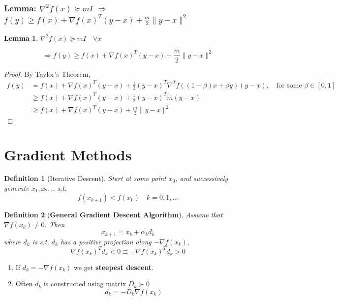 \documentclass[11pt,a4paper]{article}
\newtheorem{lemma}{Lemma}
\newtheorem{definition}{Definition}
\begin{document}
\subsubsection{Lemma: $\nabla^2 f(x)\succeq mI$ $\Rightarrow$ $f(y)\geq f(x)+\nabla f(x)^T(y-x)+\frac{m}{2}\|y-x\|^2$}
\begin{lemma}
$\nabla^2 f(x)\succeq mI\quad \forall x$

$$\Rightarrow f(y)\geq f(x)+\nabla f(x)^T(y-x)+\frac{m}{2}\|y-x\|^2$$
\end{lemma}
\begin{proof}
    By Taylor's Theorem,
    \begin{equation}
        \begin{aligned}
            f(y)&=f(x)+\nabla f(x)^T(y-x)+\frac{1}{2}(y-x)^T \nabla^T f((1-\beta)x+\beta y)(y-x),\quad \text{for some }\beta\in[0,1]\\
            &\geq f(x)+\nabla f(x)^T(y-x)+\frac{1}{2}(y-x)^Tm(y-x)\\
            &\geq f(x)+\nabla f(x)^T(y-x)+\frac{m}{2}\|y-x\|^2
        \end{aligned}
        \nonumber
    \end{equation}
\end{proof}

















\section{Gradient Methods}
\begin{definition}[Iterative Descent]
Start at some point $x_0$, and successively generate $x_1,x_2,..$ s.t. $$f(x_{k+1})<f(x_k)\quad k=0,1,...$$
\end{definition}

\begin{definition}[\textbf{General Gradient Descent Algorithm}]
    Assume that $\nabla f(x_k)\neq 0$. Then
    $$x_{k+1}=x_k+\alpha_k d_k$$
    where $d_k$ is s.t. $d_k$ has a positive projection along $-\nabla f(x_k)$,
    $$\nabla f(x_k)^T d_k<0 \equiv -\nabla f(x_k)^T d_k>0$$
\end{definition}
\begin{enumerate}[$\bullet$]
    \item If $d_k=-\nabla f(x_k)$ we get \textbf{steepest descent}.
    \item Often $d_k$ is constructed using matrix $D_k \succ 0$ $$d_k=-D_k\nabla f(x_k)$$
\end{enumerate}
\end{document}
